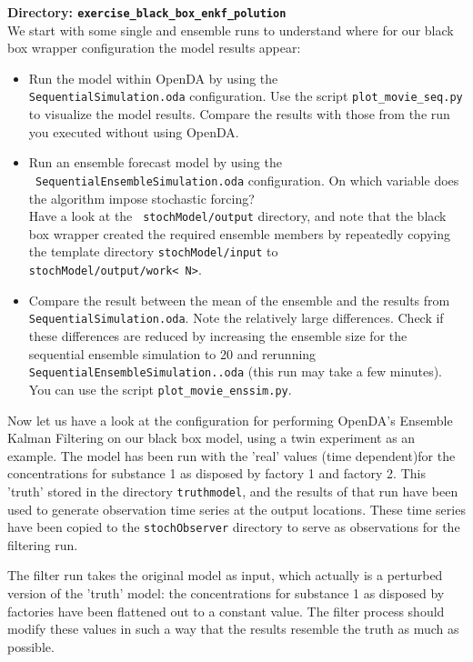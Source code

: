 {\bf Directory: {\tt exercise\_black\_box\_enkf\_polution}}\\

We start with some single and ensemble runs to understand where for our black
box wrapper configuration the model results appear:
\begin{itemize}

 \item Run the model within OpenDA by using
   the \\{\tt SequentialSimulation.oda} configuration. Use the script  {\tt plot\_movie\_seq.py} to visualize the model 
   results. Compare the results with
   those from the run you executed without using OpenDA. 
 \item Run an ensemble forecast model by using the \\{\tt
   SequentialEnsembleSimulation.oda} configuration. On which variable does the
   algorithm impose stochastic forcing?\\ Have a look at the {\tt
     stochModel/output} directory, and note that the black box wrapper created
   the required ensemble members by repeatedly copying the template directory
   {\tt stochModel/input} to\\ {\tt stochModel/output/work\textless
     N\textgreater}.
 \item Compare the result between the mean of the ensemble and the results from {\tt
     SequentialSimulation.oda}. Note the relatively large differences. Check if
   these differences are reduced by increasing the ensemble size for the
   sequential ensemble simulation to 20 and rerunning {\tt
     SequentialEnsembleSimulation..oda} (this run may take a few minutes).
     You can use the script {\tt plot\_movie\_enssim.py}.
\end{itemize}

Now let us have a look at the configuration for performing OpenDA's Ensemble
Kalman Filtering on our black box model, using a twin experiment as an example.
The model has been run with the 'real' values (time dependent)for the
concentrations for substance 1 as disposed by factory 1 and factory 2. This
'truth' stored in the directory {\tt truthmodel}, and the results of that run
have been used to generate observation time series at the output locations.
These time series have been copied to the {\tt stochObserver} directory to
serve as observations for the filtering run.

The filter run takes the original model as input, which actually is a perturbed
version of the 'truth' model: the concentrations for substance 1 as disposed by
factories have been flattened out to a constant value. The filter process
should modify these values in such a way that the results resemble the truth as
much as possible.

